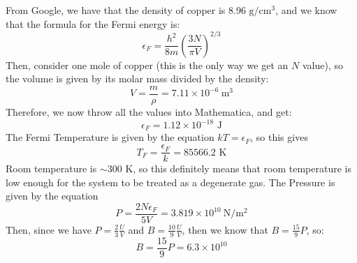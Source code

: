 \documentclass[10pt]{article}
\begin{document}
	\begin{solution}
		From Google, we have that the density of copper is 8.96 \( \mathrm{g/cm^3} \), and we know that the 
		formula for the Fermi energy is: 
		\[
		\epsilon_F = \frac{h^2}{8m}\left( \frac{3N}{\pi V} \right)^{2 /3}
		\] 
		Then, consider one mole of copper (this is the only way we get an \( N \) value), so the volume 
		is given by its molar mass divided by the density:
		\[
			V = \frac{m}{\rho} = 7.11 \times 10^{-6} \ \mathrm{m^3}
		\] 
		Therefore, we now throw all the values into Mathematica, and get:
		\[
			\epsilon_F = 1.12 \times  10^{-18} \text{ J}
		\] 
		The Fermi Temperature is given by the equation \( kT = \epsilon_F \), so this gives 
		\[
		T_F = \frac{\epsilon_F}{k} = 85566.2 \text{ K}
		\] 
		Room temperature is \( \sim300 \) K, so this definitely means that room temperature is low enough 
		for the system to be treated as a degenerate gas. The Pressure is given by the equation 
		\[
			P = \frac{2N\epsilon_F}{5V} = 3.819 \times 10^{10} \  \mathrm{N / m^2}
		\] 
		Then, since we have \( P = \frac{2}{3}\frac{U}{V} \) and \( B = \frac{10}{9} \frac{U}{V} \), then 
		we know that \( B = \frac{15}{9}P \), so:
		\[
		B = \frac{15}{9}P = 6.3 \times 10^{10}
		\] 
	\end{solution}

	\pagebreak
\end{document}

